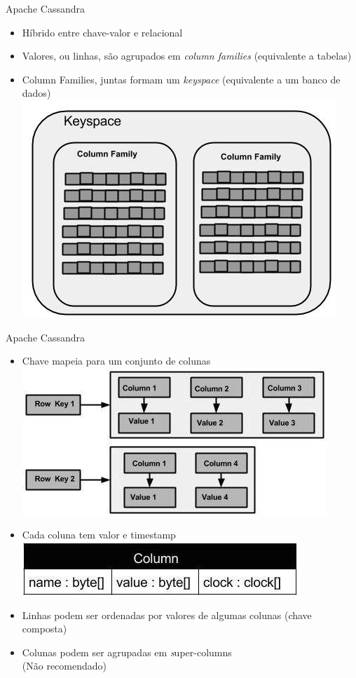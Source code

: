 \begin{frame}{Apache Cassandra}
\begin{itemize}
\item Híbrido entre chave-valor e relacional
\item Valores, ou linhas, são agrupados em \emph{column families} (equivalente a tabelas)
\item Column Families, juntas formam um \emph{keyspace} (equivalente a um banco de dados)
\includegraphics[width=.7\textwidth]{images/cass_keyspace}
\end{itemize}
\end{frame}


\begin{frame}{Apache Cassandra}
\begin{itemize}
\item Chave mapeia para um conjunto de colunas
\includegraphics[width=.7\textwidth]{images/cass_column_family}

\item Cada coluna tem valor e timestamp
\includegraphics[width=.7\textwidth]{images/cass_column}


\item Linhas podem ser ordenadas por valores de algumas colunas (chave composta)

\item Colunas podem ser agrupadas em {\emph super-columns}\\
(Não recomendado)

\end{itemize}
\end{frame}




